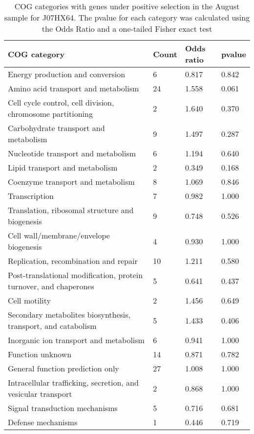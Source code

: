 \begin{table}[hb]
\footnotesize 
	\tabcolsep=0.11cm 
\caption{COG categories with genes under positive selection in the August sample for J07HX64. The pvalue for each category was calculated using the Odds Ratio and a one-tailed Fisher exact test} 
\begin{tabularx}{\textwidth}{L{6cm}R{2cm}R{2cm}R{2cm}} 
\hline 
\textbf{COG category} & \textbf{Count} & \textbf{Odds ratio} & \textbf{pvalue} \\ 
\hline 
Energy production and conversion & 6 & 0.817 & 0.842 \\ 
Amino acid transport and metabolism & 24 & 1.558 & 0.061 \\ 
Cell cycle control, cell division, chromosome partitioning & 2 & 1.640 & 0.370 \\ 
Carbohydrate transport and metabolism & 9 & 1.497 & 0.287 \\ 
Nucleotide transport and metabolism & 6 & 1.194 & 0.640 \\ 
Lipid transport and metabolism & 2 & 0.349 & 0.168 \\ 
Coenzyme transport and metabolism & 8 & 1.069 & 0.846 \\ 
Transcription & 7 & 0.982 & 1.000 \\ 
Translation, ribosomal structure and biogenesis & 9 & 0.748 & 0.526 \\ 
Cell wall/membrane/envelope biogenesis & 4 & 0.930 & 1.000 \\ 
Replication, recombination and repair & 10 & 1.211 & 0.580 \\ 
Post-translational modification, protein turnover, and chaperones & 5 & 0.641 & 0.437 \\ 
Cell motility & 2 & 1.456 & 0.649 \\ 
Secondary metabolites biosynthesis, transport, and catabolism & 5 & 1.433 & 0.406 \\ 
Inorganic ion transport and metabolism & 6 & 0.941 & 1.000 \\ 
Function unknown & 14 & 0.871 & 0.782 \\ 
General function prediction only & 27 & 1.008 & 1.000 \\ 
Intracellular trafficking, secretion, and vesicular transport & 2 & 0.868 & 1.000 \\ 
Signal transduction mechanisms & 5 & 0.716 & 0.681 \\ 
Defense mechanisms & 1 & 0.446 & 0.719 \\ 
\end{tabularx} 
\label{August_COG_Selection_J07HX64} 
 \end{table} 

